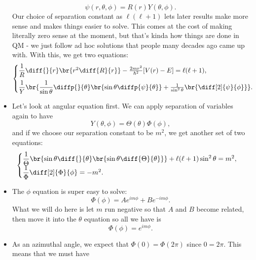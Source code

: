 \begin{itemize}
\begin{equation}
            \psi(r,\theta,\phi) = R(r)Y(\theta,\phi).
        \end{equation}
        Our choice of separation constant as $\ell(\ell+1)$ lets later results make more sense and makes things easier to solve. This comes at the cost of making literally zero sense at the moment, but that's kinda how things are done in QM - we just follow ad hoc solutions that people many decades ago came up with. With this, we get two equations:
        \begin{equation}
            \begin{cases}
                \dfrac{1}{R}\diff{}{r}\br{r^2 \diff{R}{r}} - \frac{2mr^2}{\hbar^2}[V(r) - E] = \ell(\ell + 1), \\[8pt]
                \dfrac{1}{Y}\br{\dfrac{1}{\sin\theta}\diffp{}{\theta}\br{\sin\theta \diffp{\psi}{\theta}} + \frac{1}{\sin^2\theta}\br{\diff[2]{\psi}{\phi}}}.
            \end{cases}
        \end{equation}
    \item Let's look at angular equation first. We can apply separation of variables again to have
        \begin{equation}
            Y(\theta,\phi) = \Theta(\theta)\Phi(\phi),
        \end{equation}
        and if we choose our separation constant to be $m^2$, we get another set of two equations:
        \begin{equation}
            \begin{cases}
                \dfrac{1}{\Theta}\br{\sin\theta \diff{}{\theta}\br{\sin\theta \diff{\Theta}{\theta}}} + \ell(\ell + 1)\sin^2\theta = m^2, \\
                \dfrac{1}{\Phi}\diff[2]{\Phi}{\phi} = -m^2.
            \end{cases}
        \end{equation}
    \item The $\phi$ equation is super easy to solve:
        \begin{equation}
            \Phi(\phi) = Ae^{im\phi} + Be^{-im\phi}.
        \end{equation}
        What we will do here is let $m$ run negative so that $A$ and $B$ become related, then move it into the $\theta$ equation so all we have is
        \begin{equation}
            \Phi(\phi) = e^{im\phi}.
        \end{equation}
    \item As an azimuthal angle, we expect that $\Phi(0) = \Phi(2\pi)$ since $0=2\pi$. This means that we must have

\end{itemize}
